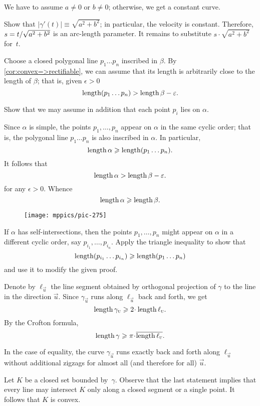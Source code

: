 \begin{multicols}{2}
We have to assume $a\ne 0$ or $b\ne0$;
otherwise, we get a constant curve.

Show that $|\gamma'(t)|\equiv \sqrt{a^2+b^2}$;
in particular, the velocity is constant.
Therefore, $s\z=t/\sqrt{a^2+b^2}$ is an arc-length parameter.
It remains to substitute $s\cdot \sqrt{a^2+b^2}$ for~$t$.




Choose a closed polygonal line $p_1\dots p_n$ inscribed in $\beta$.
By \ref{cor:convex=>rectifiable}, we can assume that its length is arbitrarily close to the length of $\beta$;
that is, given $\epsilon>0$ 
\[\mathop{\rm length}\nolimits (p_1\dots p_n)>\mathop{\rm length}\nolimits\beta-\varepsilon.\]

Show that we may assume in addition that each point $p_i$ lies on $\alpha$.

Since $\alpha$ is simple, the points $p_1,\dots,p_n$ appear on $\alpha$ in the same cyclic order;
that is, the polygonal line $p_1\dots p_n$ is also inscribed in $\alpha$.
In particular,
\[\mathop{\rm length}\nolimits\alpha\geqslant \mathop{\rm length}\nolimits (p_1\dots p_n).\]
It follows that 
\[\mathop{\rm length}\nolimits\alpha>\mathop{\rm length}\nolimits\beta-\varepsilon.\]
for any $\epsilon>0$.
Whence 
\[\mathop{\rm length}\nolimits\alpha\geqslant\mathop{\rm length}\nolimits\beta.\]

\begin{wrapfigure}{r}{25 mm}
\vskip-6mm
\centering
\texttt{[image: mppics/pic-275]}
\vskip0mm
\end{wrapfigure}

If $\alpha$ has self-intersections, then the points $p_1,\dots, p_n$ might appear on $\alpha$ in a different cyclic order, say $p_{i_1},\dots,p_{i_n}$.
Apply the triangle inequality to show that 
\[\mathop{\rm length}\nolimits(p_{i_1}\dots p_{i_n})\geqslant \mathop{\rm length}\nolimits (p_1\dots p_n)\]
and use it to modify the given proof.



Denote by $\ell_{\vec u}$ the line segment 
obtained by orthogonal projection of $\gamma$ to the line in the direction ${\vec u}$.
Since $\gamma_{\vec u}$ runs along $\ell_{\vec u}$ back and forth, we get 
\[\length\gamma_{\vec u}\ge 2\cdot\length\ell_{\vec u}.\]
By the Crofton formula, 
\[\length\gamma\ge \pi\cdot \overline{\length\ell_{\vec u}}.\]

In the case of equality, the curve $\gamma_{\vec u}$ runs exactly back and forth along $\ell_{\vec u}$ without additional zigzags for almost all (and therefore for all) ${\vec u}$.

Let $K$ be a closed set bounded by~$\gamma$.
Observe that the last statement implies that every line may intersect $K$ only along a closed segment or a single point.
It follows that $K$ is convex.


\end{multicols}
